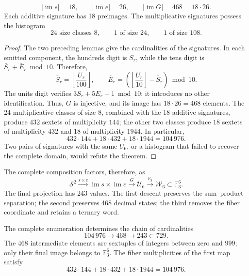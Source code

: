 \begin{theorem}
\label{pf84:E02-20}
\[
|\operatorname{im}s|=18,\qquad
|\operatorname{im}e|=26,\qquad
|\operatorname{im}G|=468=18\cdot26.
\]
Each additive signature has 18 preimages. The multiplicative signatures possess
the histogram
\[
24\text{ size classes }8,\qquad
1\text{ of size }24,\qquad
1\text{ of size }108.
\]
\end{theorem}
\begin{proof}
The two preceding lemmas give the cardinalities of the signatures. In each emitted
component, the hundreds digit is \(\bar S_r\), while the tens digit is
\(\bar S_r+\bar E_r\bmod10\). Therefore,
\[
 \bar S_r=\left\lfloor\frac{U_r}{100}\right\rfloor,\qquad
 \bar E_r=
 \left(\left\lfloor\frac{U_r}{10}\right\rfloor-\bar S_r\right)\bmod10.
\]
The units digit verifies \(3S_r+5E_r+1\bmod10\); it introduces no other
identification. Thus, \(G\) is injective, and its image has
\(18\cdot26=468\) elements. The \(24\) multiplicative classes of size
\(8\), combined with the \(18\) additive signatures, produce \(432\) sextets
of multiplicity \(144\); the other two classes produce \(18\) sextets of
multiplicity \(432\) and \(18\) of multiplicity \(1944\). In particular,
\[
 432\cdot144+18\cdot432+18\cdot1944=104\,976.
\]
Two pairs of signatures with the same \(U_6\), or a histogram that
failed to recover the complete domain, would refute the theorem.
\end{proof}

The complete composition factors, therefore, as
\[
\mathcal S^2\xrightarrow{s\times e}
\operatorname{im}s\times\operatorname{im}e
\xrightarrow{G}\mathcal U_6
\xrightarrow{\rho_3}\mathcal W_6\subset\mathbb F_3^6.
\]
The final projection has 243 values. The first descent preserves the
sum--product separation; the second preserves 468 decimal states; the
third removes the fiber coordinate and retains a ternary word.

\begin{corollary}
\label{cor:censo-proyeccion-observable}
\label{pf84:E02-21}
The complete enumeration determines the chain of cardinalities
\[
 104\,976\longrightarrow468\longrightarrow243\subset729.
\]
The \(468\) intermediate elements are sextuples of integers between
zero and \(999\); only their final image belongs to \(\mathbb F_3^6\). The
fiber multiplicities of the first map satisfy
\[
 432\cdot144+18\cdot432+18\cdot1944=104\,976.
\]
\end{corollary}

